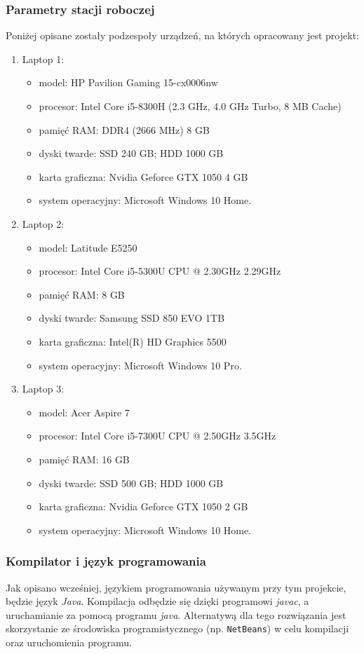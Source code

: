\documentclass[12pt,a4paper]{article}
\begin{document}
\subsubsection{Parametry stacji roboczej} %
Poniżej opisane zostały podzespoły urządzeń, na których opracowany jest projekt:
\begin{enumerate}
\item Laptop 1:
\begin{itemize}
\item model: HP Pavilion Gaming 15-cx0006nw
\item procesor: Intel Core i5-8300H (2.3 GHz, 4.0 GHz Turbo, 8 MB Cache)
\item pamięć RAM: DDR4 (2666 MHz) 8 GB
\item dyski twarde: SSD 240 GB; HDD 1000 GB
\item karta graficzna: Nvidia Geforce GTX 1050 4 GB
\item system operacyjny: Microsoft Windows 10 Home.
\end{itemize}
\item Laptop 2:
\begin{itemize}
\item model: Latitude E5250
\item procesor: Intel Core i5-5300U CPU @ 2.30GHz  2.29GHz
\item pamięć RAM: 8 GB
\item dyski twarde: Samsung SSD 850 EVO 1TB 
\item karta graficzna: Intel(R) HD Graphics 5500
\item system operacyjny: Microsoft Windows 10 Pro.
\end{itemize}
\item Laptop 3:
\begin{itemize}
\item model: Acer Aspire 7 
\item procesor: Intel Core i5-7300U CPU @ 2.50GHz  3.5GHz
\item pamięć RAM: 16 GB
\item dyski twarde: SSD 500 GB; HDD 1000 GB
\item karta graficzna: Nvidia Geforce GTX 1050 2 GB
\item system operacyjny: Microsoft Windows 10 Home.
\end{itemize}
\end{enumerate}

\subsubsection{Kompilator i język programowania} %
Jak opisano wcześniej, językiem programowania używanym przy tym projekcie, będzie język \textit{Java}. Kompilacja odbędzie się dzięki programowi \textit{javac}, a uruchamianie za pomocą programu \textit{java}. Alternatywą dla tego rozwiązania jest skorzystanie ze środowiska programistycznego (np. \texttt{NetBeans}) w celu kompilacji oraz uruchomienia programu.
\end{document}
